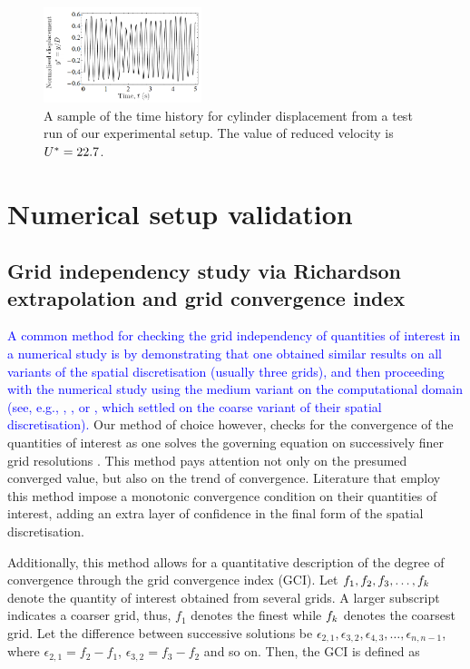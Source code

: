 \documentclass[a4paper,fleqn]{cas-sc}
\begin{document}
\begin{figure}
  \centering
  \includegraphics[width=0.41\textwidth]{figs/figure5}
  \caption{A sample of the time history for cylinder displacement from a test run of our experimental setup. The value of reduced velocity is $U^{*} = 22.7$.}
  \label{fig:sampTimeHist}
\end{figure}


\section{Numerical setup validation} \label{sec:numSetup}
\subsection{Grid independency study via Richardson extrapolation and grid convergence index} \label{ssec:richExtrap}
\textcolor{blue}{A common method for checking the grid independency of quantities of interest in a numerical study is by demonstrating that one obtained similar results on all variants of the spatial discretisation (usually three grids), and then proceeding with the numerical study using the medium variant on the computational domain (see, e.g., \citet{Ding2013}, \citet{Ding2019}, or \citet{Wang2020}, which settled on the coarse variant of their spatial discretisation).} Our method of choice however, checks for the convergence of the quantities of interest as one solves the governing equation on successively finer grid resolutions \citep{Richardson1927,Stern2001}. This method pays attention not only on the presumed converged value, but also on the trend of convergence. Literature that employ this method impose a monotonic convergence condition \citep{Stern2001,MatAli2011,Ali2012,Maruai2018} on their quantities of interest, adding an extra layer of confidence in the final form of the spatial discretisation.

Additionally, this method allows for a quantitative description of the degree of convergence through the grid convergence index (GCI). Let $f_{1},f_{2},f_{3},\dots,f_{k}$ denote the quantity of interest obtained from several grids. A larger subscript indicates a coarser grid, thus, $f_{1}$ denotes the finest while $f_{k}$ denotes the coarsest grid. Let the difference between successive solutions be $\epsilon_{2,1},\epsilon_{3,2},\epsilon_{4,3},\dots,\epsilon_{n,n-1}$, where $\epsilon_{2,1} = f_{2} - f_{1}$, $\epsilon_{3,2} = f_{3} - f_{2}$ and so on. Then, the GCI is defined as
\end{document}
